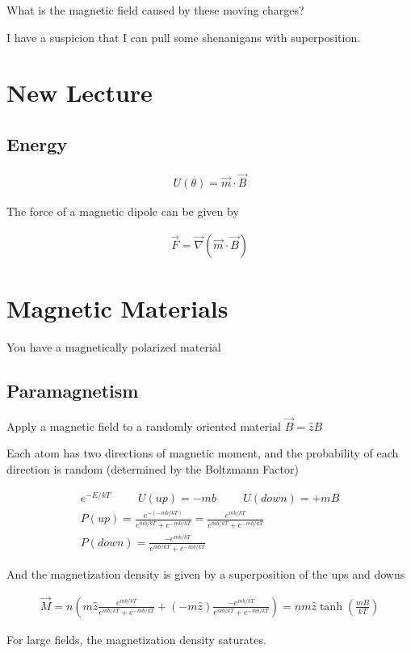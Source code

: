 \documentclass[fleqn]{report}
\newcommand{\hp}{\hspace{1cm}}
\newcommand{\equations} [1] {
\begin{gather*}
#1
\end{gather*}
}
\begin{document}
What is the magnetic field caused by these moving charges? 

I have a suspicion that I can pull some shenanigans with superposition. 

\section{New Lecture}
\subsection{Energy}
\equations{
    U(\theta)
    =
    \vec m \cdot \vec B 
}

The force of a magnetic dipole can be given by 

\equations{
    \vec F 
    =
    \vec \nabla 
    \left(
        \vec m \cdot \vec B 
    \right)
}

\section{Magnetic Materials}

You have a magnetically polarized material 

\subsection{Paramagnetism}
Apply a magnetic field to a randomly oriented material $\vec B = \hat z B$ 

Each atom has two directions of magnetic moment, and the probability of each 
direction is random (determined by the Boltzmann Factor)

\equations{
    e^{-E/ kT}
    \hp 
    U(up) = -mb \hp U(down) = + mB 
    \\
    P(up)
    =
    \frac{e^{-(-mb/kT)}}{e^{mb/kT} + e^{-mb/kT}}
    =
    \frac{e^{mb/kT}}{e^{mb/kT} + e^{-mb/kT}}
    \\
    P(down)
    =
    \frac{-e^{mb/kT}}{e^{mb/kT} + e^{-mb/kT}}
}

And the magnetization density is given by a superposition of the ups and downs 

\equations{
    \vec M 
    =
    n 
    \left(
        m \hat z 
        \frac{e^{mb/kT}}{e^{mb/kT} + e^{-mb/kT}}
        +
        (-m \hat z )
        \frac{-e^{mb/kT}}{e^{mb/kT} + e^{-mb/kT}}
    \right)
    =
    nm \hat z 
    \tanh(\frac{mB}{kT})
}

For large fields, the magnetization density saturates.
\end{document}
